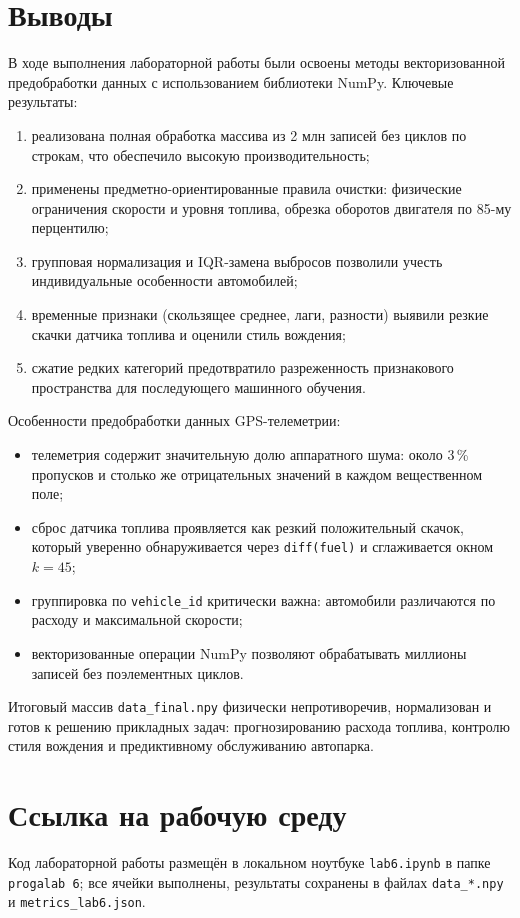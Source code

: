 \documentclass[oneside,a4paper,14pt]{extarticle}
\begin{document}
\section*{Выводы}
В ходе выполнения лабораторной работы были освоены методы векторизованной предобработки данных с использованием библиотеки NumPy. Ключевые результаты:
\begin{enumerate}[leftmargin=*]
	\item реализована полная обработка массива из 2 млн записей без циклов по строкам, что обеспечило высокую производительность;
	\item применены предметно-ориентированные правила очистки: физические ограничения скорости и уровня топлива, обрезка оборотов двигателя по 85-му перцентилю;
	\item групповая нормализация и IQR-замена выбросов позволили учесть индивидуальные особенности автомобилей;
	\item временные признаки (скользящее среднее, лаги, разности) выявили резкие скачки датчика топлива и оценили стиль вождения;
	\item сжатие редких категорий предотвратило разреженность признакового пространства для последующего машинного обучения.
\end{enumerate}

Особенности предобработки данных GPS-телеметрии:
\begin{itemize}[leftmargin=*]
	\item телеметрия содержит значительную долю аппаратного шума: около 3\,\% пропусков и столько же отрицательных значений в каждом вещественном поле;
	\item сброс датчика топлива проявляется как резкий положительный скачок, который уверенно обнаруживается через \texttt{diff(fuel)} и сглаживается окном $k=45$;
	\item группировка по \texttt{vehicle\_id} критически важна: автомобили различаются по расходу и максимальной скорости;
	\item векторизованные операции NumPy позволяют обрабатывать миллионы записей без поэлементных циклов.
\end{itemize}

Итоговый массив \texttt{data\_final.npy} физически непротиворечив, нормализован и готов к решению прикладных задач: прогнозированию расхода топлива, контролю стиля вождения и предиктивному обслуживанию автопарка.

\section*{Ссылка на рабочую среду}
Код лабораторной работы размещён в локальном ноутбуке \texttt{lab6.ipynb} в папке \texttt{progalab 6}; все ячейки выполнены, результаты сохранены в файлах \texttt{data\_*.npy} и \texttt{metrics\_lab6.json}.
\end{document}
